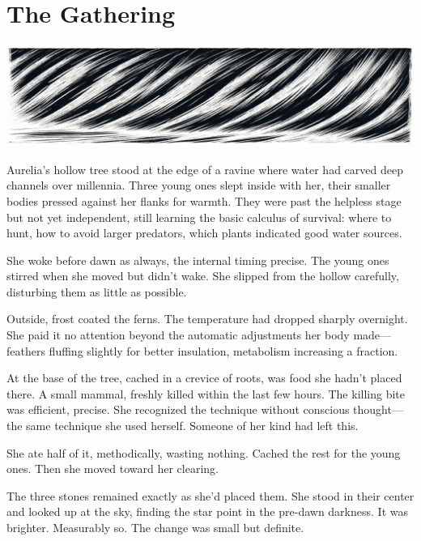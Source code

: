 \chapter{The Gathering}
\label{ch:03}



\begin{center}
\includegraphics[width=\textwidth]{images/chapterImages/genesis_sketch_00056_.png}
\end{center}

Aurelia's hollow tree stood at the edge of a ravine where water had carved deep channels over millennia. Three young ones slept inside with her, their smaller bodies pressed against her flanks for warmth. They were past the helpless stage but not yet independent, still learning the basic calculus of survival: where to hunt, how to avoid larger predators, which plants indicated good water sources.

She woke before dawn as always, the internal timing precise. The young ones stirred when she moved but didn't wake. She slipped from the hollow carefully, disturbing them as little as possible.

Outside, frost coated the ferns. The temperature had dropped sharply overnight. She paid it no attention beyond the automatic adjustments her body made—feathers fluffing slightly for better insulation, metabolism increasing a fraction.

At the base of the tree, cached in a crevice of roots, was food she hadn't placed there. A small mammal, freshly killed within the last few hours. The killing bite was efficient, precise. She recognized the technique without conscious thought—the same technique she used herself. Someone of her kind had left this.

She ate half of it, methodically, wasting nothing. Cached the rest for the young ones. Then she moved toward her clearing.

The three stones remained exactly as she'd placed them. She stood in their center and looked up at the sky, finding the star point in the pre-dawn darkness. It was brighter. Measurably so. The change was small but definite.

